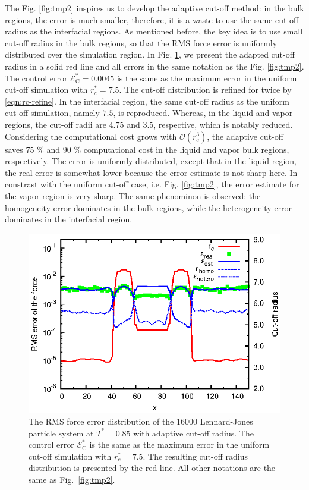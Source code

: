 \documentclass[aps,pre,preprint]{revtex4}
\begin{document}
The Fig. \ref{fig:tmp2} inspires us to develop the adaptive cut-off
method: in the bulk regions, the error is much smaller, therefore, it
is a waste to use the same cut-off radius as the interfacial
regions. As mentioned before, the key idea is to use small cut-off
radius in the bulk regions, so that the RMS force error is uniformly
distributed over the simulation region. In Fig. \ref{fig:tmp3}, we
present the adapted cut-off radius in a solid red line and all errors
in the same notation as the Fig. \ref{fig:tmp2}. The control error
$\mathcal E^\ast_{\textrm{C}} = 0.0045$ is the same as the maximum
error in the uniform cut-off simulation with $r_c^\ast=7.5$. The
cut-off distribution is refined for twice by \eqref{eqn:rc-refine}. In
the interfacial region, the same cut-off radius as the uniform cut-off
simulation, namely $7.5$, is reproduced.  Whereas, in the liquid and
vapor regions, the cut-off radii are $4.75$ and $3.5$, respective,
which is notably reduced. Considering the computational cost grows
with $\mathcal O(r_c^3)$, the adaptive cut-off saves 75 \% and 90 \%
computational cost in the liquid and vapor bulk regions, respectively.
The error is uniformly distributed, except that in the liquid region,
the real error is somewhat lower because the error estimate is not
sharp here. In constrast with the uniform cut-off case,
i.e. Fig. \ref{fig:tmp2}, the error estimate for the vapor region is
very sharp. The same phenominon is observed: the homogeneity error
dominates in the bulk regions, while the heterogeneity error dominates
in the interfacial region.

\begin{figure}
  \centering
  \includegraphics[]{fig/t0.85-n16000-adapt-e0.0045-extend/rcut.and.error.eps}
  \caption{ The RMS force error distribution of the 16000
    Lennard-Jones particle system at $T^\ast=0.85$ with adaptive
    cut-off radius. The control error $\mathcal E^\ast_{\textrm{C}}$
    is the same as the maximum error in the uniform cut-off simulation
    with $r_c^\ast=7.5$.  The resulting cut-off radius distribution is
    presented by the red line. All other notations are the same as
    Fig.~\ref{fig:tmp2}.}
  \label{fig:tmp3}
\end{figure}
\end{document}
